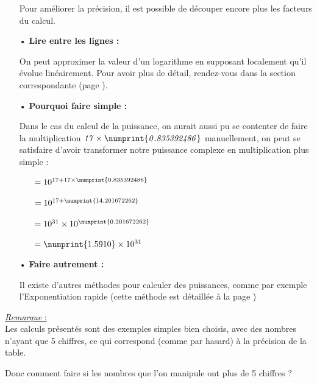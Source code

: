 \documentclass[a4paper, twoside]{article}
\begin{document}
\begin{itemize}
\begin{small}
		Pour améliorer la précision, il est possible de découper encore plus les facteurs du calcul.
		
		\end{small}

		
		\vfill
		
		\item[•] \textbf{Lire entre les lignes :} 
		
		{\small On peut approximer la valeur d'un logarithme en supposant localement qu'il évolue linéairement. Pour avoir plus de détail, rendez-vous dans la section correspondante (page \pageref{approximation_lineaire}).}
		
		\vfill
		
		\item[•] \textbf{Pourquoi faire simple :} 
		
		\begin{small}
		Dans le cas du calcul de la puissance, on aurait aussi pu se contenter de faire la multiplication $\mathit{17 \times \numprint{0.835392486} }$ manuellement, on peut se satisfaire d'avoir transformer notre puissance complexe en multiplication plus simple :
		\vspace{0.1cm}
		
		\begin{itemize}
			\item[] $= 10^{17 + 17 \times \numprint{0.835 392 486}}$
			\item[] $= 10^{17 + \numprint{14.201672262}}$
			\item[] $= 10^{31} \times 10^{\numprint{0.201672262}}$
			\item[] $= \numprint{1.5910} \times 10 ^{31}$
		\end{itemize}
		\end{small}
		
		\vfill
		
		\item[•] \textbf{Faire autrement :} 
		
		{\small Il existe d'autres méthodes pour calculer des puissances, comme par exemple l'Exponentiation rapide (cette méthode est détaillée à la page \pageref{exponentiation_rapide})}

	\end{itemize}

	\vfill

	{\noindent\underline{\textit{Remarque} :}}\\

	\vspace{-2mm}
	Les calculs présentés sont des exemples simples bien choisis, avec des nombres n'ayant que 5 chiffres, ce qui correspond (comme par hasard) à la précision de la table.
		\begin{center}
		Donc comment faire si les nombres que l'on manipule ont plus de 5 chiffres ?
		\end{center}
		
\end{document}

